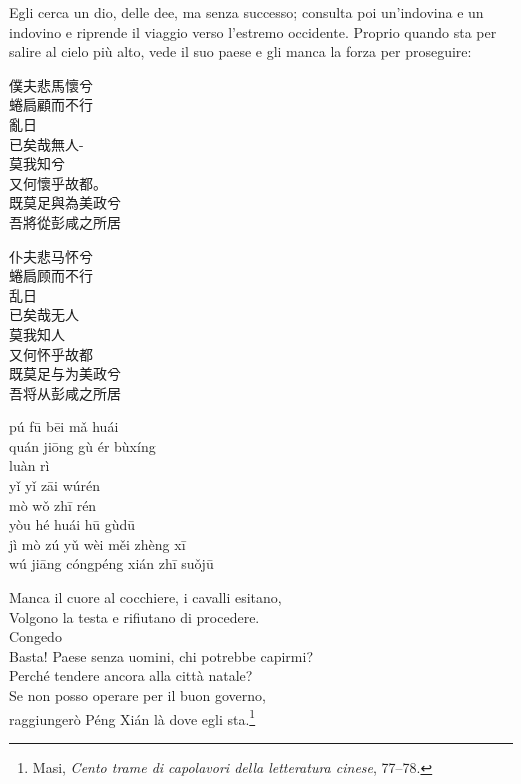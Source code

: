 \documentclass[12pt,titlepage]{article}
\begin{document}
  Egli cerca un dio, delle dee, ma senza successo; consulta poi un'indovina e un indovino e riprende il viaggio verso l'estremo occidente. Proprio quando sta per salire al cielo più alto, vede il suo paese e gli manca la forza per proseguire:
\begin{adjustwidth}{-1cm}{-1cm}%
\setlength\columnsep{0.5cm}
\begin{multicols}{3}
\noindent
 \begin{CJK*}{UTF8}{gbsn}
 僕夫悲馬懷兮\\
 蜷扃顧而不行\\
 亂日\\
 已矣哉無人-\\
 莫我知兮\\
 又何懷乎故都。\\
 既莫足與為美政兮 \\
吾將從彭咸之所居\\%
\end{CJK*}

\columnbreak
\noindent
 \begin{CJK*}{UTF8}{gbsn}
仆夫悲马怀兮\\
 蜷扃顾而不行\\
 乱日\\
已矣哉无人\\
莫我知人\\
 又何怀乎故都\\
既莫足与为美政兮 \\
吾将从彭咸之所居\\
\end{CJK*}

\columnbreak
\noindent
pú fū bēi mǎ huái \\
quán jiōng gù ér bùxíng\\
luàn rì	\\
yǐ yǐ zāi wúrén	\\
mò wǒ zhī rén	\\
yòu hé huái hū gùdū\\
jì mò zú yǔ wèi měi zhèng xī\\
wú jiāng cóngpéng xián zhī suǒjū\\
\end{multicols}
\end{adjustwidth}
%
%
%
\begin{center}
Manca il cuore al cocchiere, i cavalli esitano,\\
Volgono la testa e rifiutano di procedere.\\
Congedo\\
Basta! Paese senza uomini, chi potrebbe capirmi?\\
Perché tendere ancora alla città natale?\\
Se non posso operare per il buon governo,\\
raggiungerò Péng Xián là dove egli sta.\footnote{Masi, \emph{Cento trame di capolavori della letteratura cinese}, 77–78.}\\
\end{center}
\end{document}
